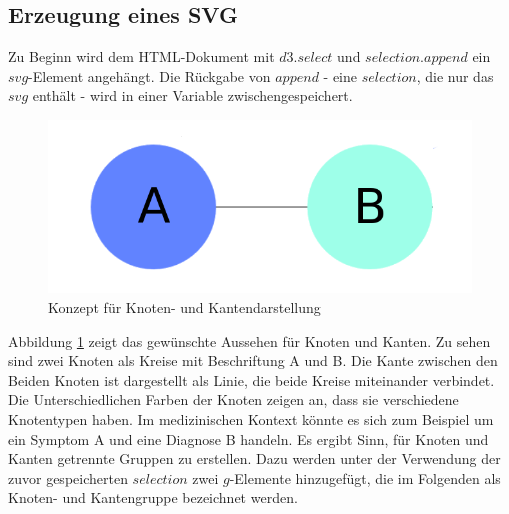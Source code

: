 \subsection{Erzeugung eines SVG}\label{sec:svgcreate}
Zu Beginn wird dem HTML-Dokument mit $d3.select$ und $selection.append$ ein $svg$-Element angehängt. Die Rückgabe von $append$ - eine $selection$, die nur das $svg$ enthält - wird in einer Variable zwischengespeichert.

\begin{figure}
	\centering
	\includegraphics[width=\linewidth]{../screenshots/knotendesign.PNG}
	\caption{Konzept für Knoten- und Kantendarstellung}
	\label{abb:design}
\end{figure} 
Abbildung \ref{abb:design} zeigt das gewünschte Aussehen für Knoten und Kanten. Zu sehen sind zwei Knoten als Kreise mit Beschriftung A und B. Die Kante zwischen den Beiden Knoten ist dargestellt als Linie, die beide Kreise miteinander verbindet. Die Unterschiedlichen Farben der Knoten zeigen an, dass sie verschiedene Knotentypen haben. Im medizinischen Kontext könnte es sich zum Beispiel um ein Symptom A und eine Diagnose B handeln. Es ergibt Sinn, für Knoten und Kanten getrennte Gruppen zu erstellen. Dazu werden unter der Verwendung der zuvor gespeicherten $selection$ zwei $g$-Elemente hinzugefügt, die im Folgenden als Knoten- und Kantengruppe bezeichnet werden.


